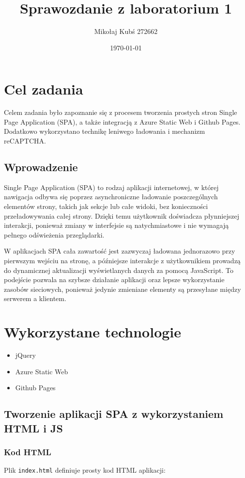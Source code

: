 \documentclass[a4paper,12pt]{article}
\title{Sprawozdanie z laboratorium 1}
\author{Mikołaj Kubś 272662}
\date{\today}
\begin{document}
\maketitle

\section{Cel zadania}
Celem zadania było zapoznanie się z procesem tworzenia prostych stron Single Page Application (SPA), a także integracją z Azure Static Web i Github Pages. Dodatkowo wykorzystano technikę leniwego ładowania i mechanizm reCAPTCHA.

\subsection{Wprowadzenie}
Single Page Application (SPA) to rodzaj aplikacji internetowej, w której nawigacja odbywa się poprzez asynchroniczne ładowanie poszczególnych elementów strony, takich jak sekcje lub całe widoki, bez konieczności przeładowywania całej strony. Dzięki temu użytkownik doświadcza płynniejszej interakcji, ponieważ zmiany w interfejsie są natychmiastowe i nie wymagają pełnego odświeżenia przeglądarki.

W aplikacjach SPA cała zawartość jest zazwyczaj ładowana jednorazowo przy pierwszym wejściu na stronę, a późniejsze interakcje z użytkownikiem prowadzą do dynamicznej aktualizacji wyświetlanych danych za pomocą JavaScript. To podejście pozwala na szybsze działanie aplikacji oraz lepsze wykorzystanie zasobów sieciowych, ponieważ jedynie zmieniane elementy są przesyłane między serwerem a klientem.

\section{Wykorzystane technologie}
\begin{itemize}
    \item jQuery
    \item Azure Static Web
    \item Github Pages
\end{itemize}

\subsection{Tworzenie aplikacji SPA z wykorzystaniem HTML i JS}

\subsubsection{Kod HTML}
Plik \texttt{index.html} definiuje prosty kod HTML aplikacji:
\end{document}
